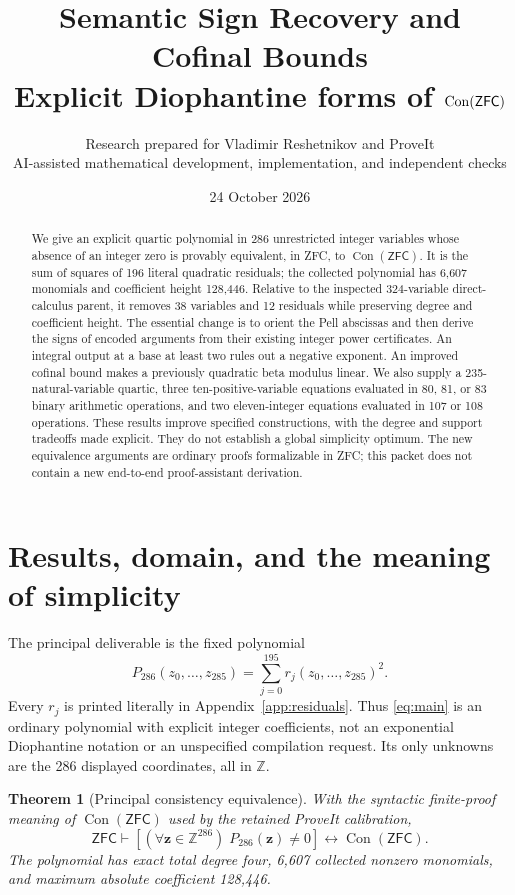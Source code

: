 \documentclass[11pt]{article}
\title{\color{navy}\bfseries Semantic Sign Recovery and Cofinal Bounds\\[5pt]
\large Explicit Diophantine forms of $\Con(\ZFC)$}
\author{Research prepared for Vladimir Reshetnikov and ProveIt\\
\small AI-assisted mathematical development, implementation, and independent checks}
\date{24 October 2026}
\newtheorem{theorem}{Theorem}[section]
\theoremstyle{remark}\newtheorem{remark}[theorem]{Remark}
\newcommand{\Z}{\mathbb Z}\newcommand{\N}{\mathbb N}
\newcommand{\Con}{\operatorname{Con}}
\newcommand{\ZFC}{\mathsf{ZFC}}
\begin{document}
\maketitle
\begin{abstract}
We give an explicit quartic polynomial in 286 unrestricted integer variables
whose absence of an integer zero is provably equivalent, in ZFC, to
$\Con(\ZFC)$. It is the sum of squares of 196 literal quadratic residuals;
the collected polynomial has 6,607 monomials and coefficient height 128,446.
Relative to the inspected 324-variable direct-calculus parent, it removes
38 variables and 12 residuals while preserving degree and coefficient height.
The essential change is to orient the Pell abscissas and then derive the
signs of encoded arguments from their existing integer power certificates.
An integral output at a base at least two rules out a negative exponent.
An improved cofinal bound makes a previously quadratic beta modulus linear.
We also supply a 235-natural-variable quartic, three ten-positive-variable
equations evaluated in 80, 81, or 83 binary arithmetic operations, and two
eleven-integer equations evaluated in 107 or 108 operations. These results
improve specified constructions, with the degree and support tradeoffs made
explicit. They do not establish a global simplicity optimum. The new
equivalence arguments are ordinary proofs formalizable in ZFC; this packet
does not contain a new end-to-end proof-assistant derivation.
\end{abstract}

\section{Results, domain, and the meaning of simplicity}

The principal deliverable is the fixed polynomial
\begin{equation}\label{eq:main}
 \boxed{\displaystyle P_{286}(z_0,\ldots,z_{285})
       =\sum_{j=0}^{195}r_j(z_0,\ldots,z_{285})^2.}
\end{equation}
Every $r_j$ is printed literally in Appendix~\ref{app:residuals}. Thus
\eqref{eq:main} is an ordinary polynomial with explicit integer coefficients,
not an exponential Diophantine notation or an unspecified compilation request.
Its only unknowns are the 286 displayed coordinates, all in $\Z$.

\begin{theorem}[Principal consistency equivalence]\label{thm:main}
With the syntactic finite-proof meaning of $\Con(\ZFC)$ used by the retained
ProveIt calibration,
\[
 \ZFC\vdash
 \left[(\forall \mathbf z\in\Z^{286})\;P_{286}(\mathbf z)\ne0\right]
 \longleftrightarrow\Con(\ZFC).
\]
The polynomial has exact total degree four, 6,607 collected nonzero monomials,
and maximum absolute coefficient 128,446.
\end{theorem}
\end{document}
